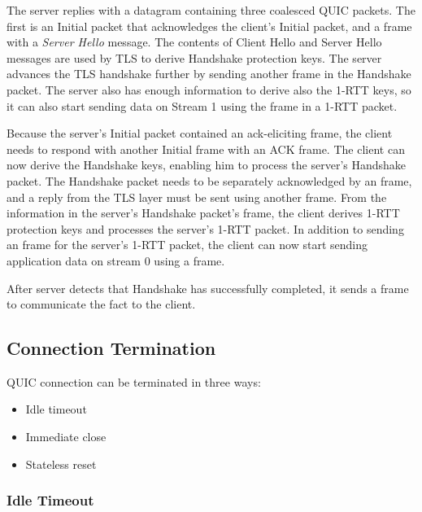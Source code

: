 
The server replies with a datagram containing three coalesced QUIC packets. The first is an Initial
packet that acknowledges the client's Initial packet, and a \CRYPTO{} frame with a \textit{Server
  Hello} message. The contents of Client Hello and Server Hello messages are used by TLS to derive
Handshake protection keys. The server advances the TLS handshake further by sending another
\CRYPTO{} frame in the Handshake packet. The server also has enough information to derive also the
1-RTT keys, so it can also start sending data on Stream 1 using the \STREAM{} frame in a 1-RTT
packet.

Because the server's Initial packet contained an ack-eliciting \CRYPTO{} frame, the client needs to
respond with another Initial frame with an ACK frame. The client can now derive the Handshake keys,
enabling him to process the server's Handshake packet. The Handshake packet needs to be separately
acknowledged by an \ACK{} frame, and a reply from the TLS layer must be sent using another \CRYPTO{}
frame. From the information in the server's Handshake packet's \CRYPTO{} frame, the client derives
1-RTT protection keys and processes the server's 1-RTT packet. In addition to sending an \ACK{}
frame for the server's 1-RTT packet, the client can now start sending application data on stream 0
using a \STREAM{} frame.

After server detects that Handshake has successfully completed, it sends a \HANDSHAKEDONE{} frame to
communicate the fact to the client.

\subsection{Connection Termination}

QUIC connection can be terminated in three ways:

\begin{itemize}

  \item Idle timeout

  \item Immediate close

  \item Stateless reset

\end{itemize}

\subsubsection{Idle Timeout}\label{sec:idle-timeout}

